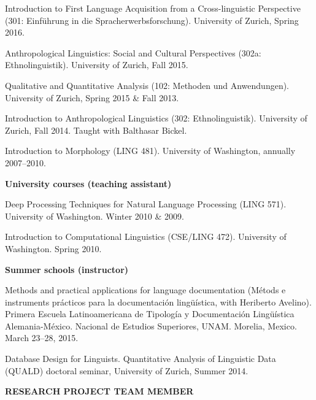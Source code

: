 \documentclass[11pt]{article}
\newcommand{\hangpara}{
 \setlength{\parindent}{0in} %
 \hangindent=0.42in %
}
\begin{document}
\vskip 6pt
\hangpara Introduction to First Language Acquisition from a Cross-linguistic Perspective (301: Einf{\"u}hrung in die Spracherwerbsforschung). University of Zurich, Spring 2016.

\vskip 6pt
\hangpara Anthropological Linguistics: Social and Cultural Perspectives (302a: Ethnolinguistik). University of Zurich, Fall 2015.

\vskip 6pt
\hangpara Qualitative and Quantitative Analysis (102: Methoden und Anwendungen). University of Zurich, Spring 2015 \& Fall 2013.

\vskip 6pt
\hangpara Introduction to Anthropological Linguistics (302: Ethnolinguistik). University of Zurich, Fall 2014. Taught with Balthasar Bickel.

\vskip 6pt
\hangpara Introduction to Morphology (LING 481). University of Washington, annually 2007--2010.

\begin{flushleft}
{\bf University courses (teaching assistant)}
\end{flushleft}
\hangpara Deep Processing Techniques for Natural Language Processing (LING 571). University of Washington. Winter 2010 \& 2009.

\vskip 6pt
\hangpara %
Introduction to Computational Linguistics (CSE/LING 472). University of Washington. Spring 2010.

\begin{flushleft}
{\bf Summer schools (instructor)}
\end{flushleft}
\hangpara Methods and practical applications for language documentation (M{\'e}tods e instruments pr{\'a}cticos para la documentaci{\'o}n ling{\"u}{\'i}stica, with Heriberto Avelino). Primera Escuela Latinoamericana de Tipolog{\'i}a y Documentaci{\'o}n Ling{\"u}{\'i}stica Alemania-M{\'e}xico. Nacional de Estudios Superiores, UNAM. Morelia, Mexico. March 23--28, 2015.

\vskip 6pt
\hangpara Database Design for Linguists. Quantitative Analysis of Linguistic Data (QUALD) doctoral seminar, University of Zurich, Summer 2014.

\newpage

\vskip 20pt
\begin{flushleft}
{\bf RESEARCH PROJECT TEAM MEMBER}
\end{flushleft}
\end{document}

